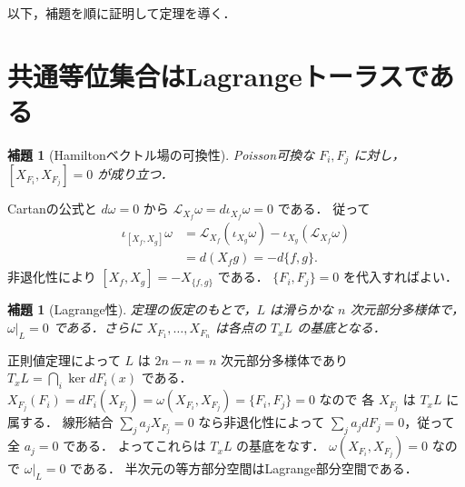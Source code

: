 \documentclass[a5paper,10pt,onecolumn]{jsarticle}
\makeatletter
\theoremstyle{mathnotetheorem}
\newtheorem{lemma}[theorem]{補題}
\renewcommand{\proofname}{証明}
\renewenvironment{proof}[1][\proofname]{%
  \par\pushQED{\qed}\normalfont\topsep4\p@\@plus2\p@\relax
  \trivlist\item[\hskip\labelsep\bfseries #1]\ignorespaces
}{\popQED\endtrivlist\@endpefalse}
\makeatother
\begin{document}
以下，補題を順に証明して定理を導く．

\section{共通等位集合はLagrangeトーラスである}
\begin{lemma}[Hamiltonベクトル場の可換性]
Poisson可換な $F_i,F_j$ に対し，
$[X_{F_i},X_{F_j}]=0$ が成り立つ．
\end{lemma}
\begin{proof}
Cartanの公式と $d\omega=0$ から
$\mathcal L_{X_f}\omega=d\iota_{X_f}\omega=0$ である．
従って
\[
 \begin{aligned}
 \iota_{[X_f,X_g]}\omega
 &=\mathcal L_{X_f}(\iota_{X_g}\omega)
   -\iota_{X_g}(\mathcal L_{X_f}\omega)\\
 &=d(X_fg)=-d\{f,g\}.
 \end{aligned}
\]
非退化性により $[X_f,X_g]=-X_{\{f,g\}}$ である．
$\{F_i,F_j\}=0$ を代入すればよい．
\end{proof}

\begin{lemma}[Lagrange性]
定理の仮定のもとで，$L$ は滑らかな $n$ 次元部分多様体で，
$\omega|_L=0$ である．さらに
$X_{F_1},\ldots,X_{F_n}$ は各点の $T_xL$ の基底となる．
\end{lemma}
\begin{proof}
正則値定理によって $L$ は $2n-n=n$ 次元部分多様体であり
$T_xL=\bigcap_i\ker dF_i(x)$ である．
$X_{F_j}(F_i)=dF_i(X_{F_j})
=\omega(X_{F_i},X_{F_j})=\{F_i,F_j\}=0$ なので
各 $X_{F_j}$ は $T_xL$ に属する．
線形結合 $\sum_ja_jX_{F_j}=0$ なら非退化性によって
$\sum_ja_jdF_j=0$，従って全 $a_j=0$ である．
よってこれらは $T_xL$ の基底をなす．
$\omega(X_{F_i},X_{F_j})=0$ なので $\omega|_L=0$ である．
半次元の等方部分空間はLagrange部分空間である．
\end{proof}
\end{document}
